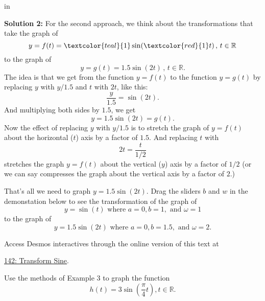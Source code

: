 \documentclass{ximera}
\newcommand{\pskip}{\vskip 0.1 in}
\begin{document}
\begin{example}
 
\begin{onlineOnly}
    \begin{center}
\end{center}
\end{onlineOnly}

\pskip

{\bf Solution 2:} For the second approach, we think about the transformations that take the graph of 
\[
      y = f(t) = \textcolor{teal}{1} \sin (\textcolor{red}{1}t) \, , \, t\in \mathbb{R}
\]
to the graph of
\[
  y = g(t) = 1.5 \sin (2t) \, , \, t\in \mathbb{R} .
\]
The idea is that we get from the function $y=f(t)$ to the function $y=g(t)$ by replacing $y$ with $y/1.5$ and $t$ with $2t$, like this: 
\[
  \frac{y}{1.5} = \sin (2t) .
\]
And multiplying both sides by $1.5$, we get
\[
        y = 1.5 \sin (2t) = g(t) .
\]
Now the effect of replacing $y$ with $y/1.5$ is to stretch the graph of $y=f(t)$ about the horizontal ($t$) axis by a factor of $1.5$. And replacing $t$ with 
\[
   2t = \frac{t}{1/2}
\]
stretches the graph $y=f(t)$ about the vertical ($y$) axis by a factor of $1/2$ (or we can say compresses the graph about the vertical axis by a factor of $2$.)

That's all we need to graph $y=1.5 \sin (2t)$. Drag the sliders $b$ and $w$ in the demonstation below to see the transformation of the graph of
\[
  y = \sin (t) \text{ where } a=0, b=1, \text{ and }\omega = 1
\] 
to the graph of 
\[
  y = 1.5 \sin (2t) \text{ where } a=0, b=1.5, \text{ and }\omega = 2 .
\] 

Access Desmos interactives through the online version of this text at
 
\href{https://www.desmos.com/calculator/qrkgbi3gtr}{142: Transform Sine}.

 
\begin{onlineOnly}
    \begin{center}
\end{center}
\end{onlineOnly}
\end{example}

\begin{question}\label{Qdgt4jh65}
Use the methods of Example 3 to graph the function
\[
   h(t) = 3\sin\left( \frac{\pi}{4}t \right) , t\in \mathbb{R}.
\]
\end{question}
\end{document}
